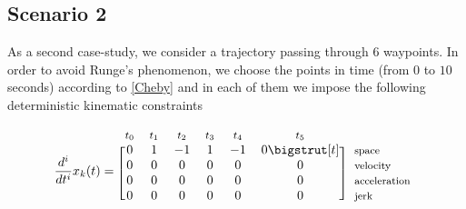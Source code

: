 \subsection{Scenario 2}
As a second case-study, we consider a trajectory passing through $6$ waypoints. In order to avoid Runge's phenomenon, we choose the points in time (from $0$ to $10$ seconds) according to \eqref{Cheby} and in each of them we impose the following deterministic kinematic constraints

\begin{equation*}
  \dfrac{d^i}{d t^i}x_k(t)=
  \begin{blockarray}{*{6}{c} l}
    \begin{block}{*{6}{>{$\footnotesize}c<{$}} l}
      $t_0$ & $t_1$ & $t_2$ & $t_3$ & $t_4$ & $t_5$ \\
    \end{block}
    \begin{block}{[*{6}{c}]>{$\footnotesize}l<{$}}
      0 & 1 & -1 & 1 & -1 & 0 \bigstrut[t]& space \\
       0 & 0 & 0 & 0 & 0 & 0 & velocity \\
       0 & 0 & 0 & 0 & 0 & 0 & acceleration \\
       0 & 0 & 0 & 0 & 0 & 0 & jerk \\
    \end{block}
  \end{blockarray}
\end{equation*}

